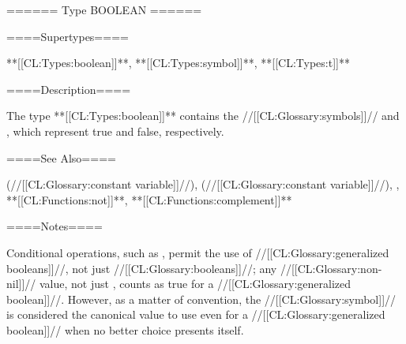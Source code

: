 ====== Type BOOLEAN ======

====Supertypes====

**[[CL:Types:boolean]]**, **[[CL:Types:symbol]]**, **[[CL:Types:t]]**

====Description====

The type **[[CL:Types:boolean]]** contains the //[[CL:Glossary:symbols]]//  and , which represent true and false, respectively.

====See Also====

 (//[[CL:Glossary:constant variable]]//),  (//[[CL:Glossary:constant variable]]//), , **[[CL:Functions:not]]**, **[[CL:Functions:complement]]**

====Notes====

Conditional operations, such as , permit the use of //[[CL:Glossary:generalized booleans]]//, not just //[[CL:Glossary:booleans]]//; any //[[CL:Glossary:non-nil]]// value, not just , counts as true for a //[[CL:Glossary:generalized boolean]]//. However, as a matter of convention, the //[[CL:Glossary:symbol]]//  is considered the canonical value to use even for a //[[CL:Glossary:generalized boolean]]// when no better choice presents itself.

